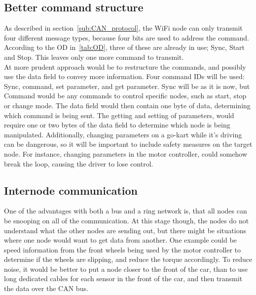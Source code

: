 \subsection*{Better command structure}
As described in section~\ref{sub:CAN_protocol}, the WiFi node can only transmit four different message types, because four bits are used to address the command. 
According to the OD in~\ref{tab:OD}, three of these are already in use; Sync, Start and Stop. 
This leaves only one more command to transmit.\\

At more prudent approach would be to restructure the commands, and possibly use the data field to convey more information. 
Four command IDs will be used: Sync, command, set parameter, and get parameter. 
Sync will be as it is now, but Command would be any commands to control specific nodes, such as start, stop or change mode. 
The data field would then contain one byte of data, determining which command is being sent.
The getting and setting of parameters, would require one or two bytes of the data field to determine which node is being manipulated.
Additionally, changing parameters on a go-kart while it's driving can be dangerous, so it will be important to include safety measures on the target node.
For instance, changing parameters in the motor controller, could somehow break the loop, causing the driver to lose control.

\subsection*{Internode communication}
One of the advantages with both a bus and a ring network is, that all nodes can be snooping on all of the communication.
At this stage though, the nodes do not understand what the other nodes are sending out, but there might be situations where one node would want to get data from another.
One example could be speed information from the front wheels being used by the motor controller to determine if the wheels are slipping, and reduce the torque accordingly. 
To reduce noise, it would be better to put a node closer to the front of the car, than to use long dedicated cables for each sensor in the front of the car, and then transmit the data over the CAN bus.\\

